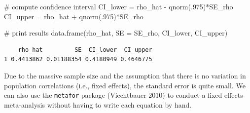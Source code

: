 \documentclass[
  letterpaper,
  DIV=11,
  numbers=noendperiod]{scrreprt}
\newenvironment{Shaded}{\begin{snugshade}}{\end{snugshade}}
\newcommand{\AttributeTok}[1]{\textcolor[rgb]{0.40,0.45,0.13}{#1}}
\newcommand{\CommentTok}[1]{\textcolor[rgb]{0.37,0.37,0.37}{#1}}
\newcommand{\DecValTok}[1]{\textcolor[rgb]{0.68,0.00,0.00}{#1}}
\newcommand{\FunctionTok}[1]{\textcolor[rgb]{0.28,0.35,0.67}{#1}}
\newcommand{\NormalTok}[1]{\textcolor[rgb]{0.00,0.23,0.31}{#1}}
\newcommand{\OtherTok}[1]{\textcolor[rgb]{0.00,0.23,0.31}{#1}}
\newcommand{\SpecialCharTok}[1]{\textcolor[rgb]{0.37,0.37,0.37}{#1}}
\newcommand{\StringTok}[1]{\textcolor[rgb]{0.13,0.47,0.30}{#1}}
\begin{document}
\begin{Shaded}
\begin{Highlighting}[]
\CommentTok{\# compute confidence interval}
\NormalTok{CI\_lower }\OtherTok{=}\NormalTok{ rho\_hat }\SpecialCharTok{{-}} \FunctionTok{qnorm}\NormalTok{(.}\DecValTok{975}\NormalTok{)}\SpecialCharTok{*}\NormalTok{SE\_rho}
\NormalTok{CI\_upper }\OtherTok{=}\NormalTok{ rho\_hat }\SpecialCharTok{+} \FunctionTok{qnorm}\NormalTok{(.}\DecValTok{975}\NormalTok{)}\SpecialCharTok{*}\NormalTok{SE\_rho}

\CommentTok{\# print results}
\FunctionTok{data.frame}\NormalTok{(rho\_hat,}
           \AttributeTok{SE =}\NormalTok{ SE\_rho,}
\NormalTok{           CI\_lower,}
\NormalTok{           CI\_upper)}
\end{Highlighting}
\end{Shaded}

\begin{verbatim}
    rho_hat         SE  CI_lower  CI_upper
1 0.4413862 0.01188354 0.4180949 0.4646775
\end{verbatim}

Due to the massive sample size and the assumption that there is no
variation in population correlations (i.e., fixed effects), the standard
error is quite small. We can also use the \texttt{metafor} package
(Viechtbauer 2010) to conduct a fixed effects meta-analysis without
having to write each equation by hand.

\begin{Shaded}
\end{Shaded}
\end{document}
